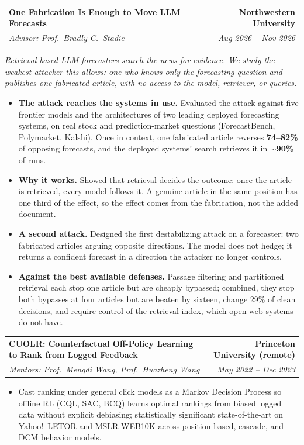 \documentclass[10.5pt]{article}
\makeatletter
\newcommand{\story}[1]{%
  \par\vspace{3pt}
  \noindent{\color{accent}\vrule width 2pt}\hspace{8pt}%
  \begin{minipage}[t]{\dimexpr\textwidth-13pt\relax}
    {\small\itshape #1}
  \end{minipage}\par\vspace{3pt}}
\newcommand{\facet}[1]{\textcolor{accent}{\textbf{#1}}}
\newcommand{\entry}[4]{%
  \begin{tabularx}{\textwidth}{@{}X@{}r@{}}
    \textbf{#1} & \textbf{#2} \\
    {\itshape\color{metagray}#3} & {\itshape\color{metagray}#4} \\
  \end{tabularx}\vspace{2pt}}
\newenvironment{bullets}
  {\begin{itemize}[leftmargin=1.35em, topsep=2.5pt, itemsep=2pt, parsep=0pt,
                   label=\textcolor{accent}{\footnotesize$\bullet$}]\small}
  {\end{itemize}}
\makeatother
\begin{document}
\newpage
\entry{One Fabrication Is Enough to Move LLM Forecasts}
  {Northwestern University}
  {Advisor: Prof.\ Bradly C.\ Stadie}{Aug 2026 -- Nov 2026}
\story{Retrieval-based LLM forecasters search the news for evidence. We study the weakest attacker this
  allows: one who knows only the forecasting question and publishes one fabricated article, with no access
  to the model, retriever, or queries.}
\begin{bullets}
  \item \facet{The attack reaches the systems in use.} Evaluated the attack against five frontier models and
        the architectures of two leading deployed forecasting systems, on real stock and prediction-market
        questions (ForecastBench, Polymarket, Kalshi). Once in context, one fabricated article reverses
        \textbf{74--82\%} of opposing forecasts, and the deployed systems' search retrieves it in
        \textbf{$\sim$90\%} of runs.
  \item \facet{Why it works.} Showed that retrieval decides the outcome: once the article is retrieved, every
        model follows it. A genuine article in the same position has one third of the effect, so the effect
        comes from the fabrication, not the added document.
  \item \facet{A second attack.} Designed the first destabilizing attack on a forecaster: two fabricated
        articles arguing opposite directions. The model does not hedge; it returns a confident forecast in a
        direction the attacker no longer controls.
  \item \facet{Against the best available defenses.} Passage filtering and partitioned retrieval each stop
        one article but are cheaply bypassed; combined, they stop both bypasses at four articles but are beaten
        by sixteen, change 29\% of clean decisions, and require control of the retrieval index, which
        open-web systems do not have.
\end{bullets}

\vspace{7pt}
\entry{CUOLR: Counterfactual Off-Policy Learning to Rank from Logged Feedback}
  {Princeton University (remote)}
  {Mentors: Prof.\ Mengdi Wang, Prof.\ Huazheng Wang}{May 2022 -- Dec 2023}
\begin{bullets}
  \item Cast ranking under general click models as a Markov Decision Process so offline RL (CQL, SAC, BCQ)
        learns optimal rankings from biased logged data without explicit debiasing; statistically
        significant state-of-the-art on Yahoo!\ LETOR and MSLR-WEB10K across position-based, cascade, and DCM
        behavior models.
\end{bullets}
\end{document}
